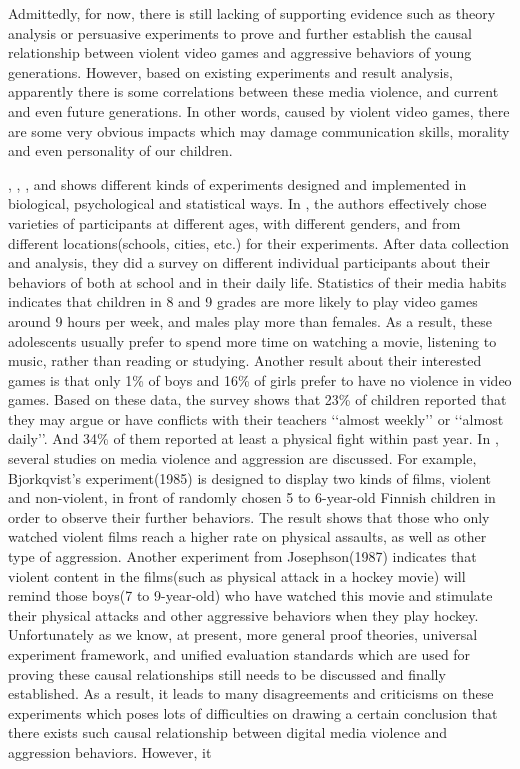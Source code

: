
\indent\indent Admittedly, for now, there is still lacking of supporting evidence such as theory analysis or persuasive experiments to prove and further establish the causal relationship between violent video games and aggressive behaviors of young generations. However, based on existing experiments and result analysis, apparently there is some correlations between these  media violence, and current and even future generations. In other words, caused by violent video games, there are some very obvious impacts which may damage communication skills, morality and even personality of our children.

 \cite{barlett2009}, \cite{ferguson2008}, \cite{gentile2004}, and \cite{anderson2003} shows different kinds of experiments designed and implemented in biological, psychological and statistical ways. In \cite{gentile2004}, the authors effectively chose varieties of participants at different ages, with different genders, and from different locations(schools, cities, etc.) for their experiments. After data collection and analysis, they did a survey on different individual participants about their behaviors of both at school and in their daily life. Statistics of their media habits indicates that children in 8 and 9 grades are more likely to play video games around 9 hours per week, and males play more than females. As a result, these adolescents usually prefer to spend more time on watching a movie, listening to music, rather than reading or studying. Another result about their interested games is that only 1\% of boys and 16\% of girls prefer to have no violence in video games. Based on these data, the survey shows that 23\% of children reported that they may argue or have conflicts with their teachers ‘‘almost weekly’’ or ‘‘almost daily’’. And 34\% of them reported at least a physical fight within past year. In \cite{anderson2003}, several studies on media violence and aggression are discussed. For example, Bjorkqvist's experiment(1985) is designed to display two kinds of films, violent and non-violent, in front of randomly chosen 5 to 6-year-old Finnish children in order to observe their further behaviors. The result shows that those who only watched violent films reach a higher rate on physical assaults, as well as other type of aggression. Another experiment from Josephson(1987) indicates that violent content in the films(such as physical attack in a hockey movie) will remind those boys(7 to 9-year-old) who have watched this movie and stimulate their physical attacks and other aggressive behaviors when they play hockey. Unfortunately as we know, at present, more general proof theories, universal experiment framework, and unified evaluation standards which are used for proving these causal relationships still needs to be discussed and finally established. As a result, it leads to many disagreements and criticisms on these experiments which poses lots of difficulties on drawing a certain conclusion that there exists such causal relationship between digital media violence and aggression behaviors. However, it 
